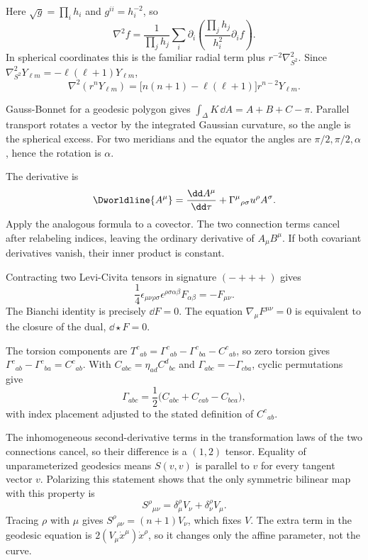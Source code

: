 \begin{solutions}
\begin{solution}
Here \(\sqrt g=\prod_i h_i\) and \(g^{ii}=h_i^{-2}\), so
\[
\nabla^2f=\frac1{\prod_jh_j}
\sum_i\partial_i\left(\frac{\prod_jh_j}{h_i^2}\partial_i f\right).
\]
In spherical coordinates this is the familiar radial term plus
\(r^{-2}\nabla^2_{S^2}\).  Since
\(\nabla^2_{S^2}Y_{\ell m}=-\ell(\ell+1)Y_{\ell m}\),
\[
\nabla^2(r^nY_{\ell m})
=\bigl[n(n+1)-\ell(\ell+1)\bigr]r^{n-2}Y_{\ell m}.
\]
\end{solution}

\begin{solution}
Gauss-Bonnet for a geodesic polygon gives
\(\int_\Delta K\,\dd A=A+B+C-\pi\).  Parallel transport rotates a vector by
the integrated Gaussian curvature, so the angle is the spherical excess.
For two meridians and the equator the angles are
\(\pi/2,\pi/2,\alpha\), hence the rotation is \(\alpha\).
\end{solution}

\begin{solution}
The derivative is
\[
\Dworldline{A^\mu}
=\frac{\dd A^\mu}{\dd\tau}
+\Gamma^\mu{}_{\rho\sigma}u^\rho A^\sigma.
\]
Apply the analogous formula to a covector.  The two connection terms cancel
after relabeling indices, leaving the ordinary derivative of \(A_\mu B^\mu\).
If both covariant derivatives vanish, their inner product is constant.
\end{solution}

\begin{solution}
Contracting two Levi-Civita tensors in signature \((-+++)\) gives
\[
\frac14\epsilon_{\mu\nu\rho\sigma}
\epsilon^{\rho\sigma\alpha\beta}F_{\alpha\beta}
=-F_{\mu\nu}.
\]
The Bianchi identity is precisely \(\dd F=0\).  The equation
\(\nabla_\mu F^{\mu\nu}=0\) is equivalent to the closure of the dual,
\(\dd\star F=0\).
\end{solution}

\begin{solution}
The torsion components are
\(T^c{}_{ab}=\Gamma^c{}_{ab}-\Gamma^c{}_{ba}-C^c{}_{ab}\), so zero torsion
gives
\(\Gamma^c{}_{ab}-\Gamma^c{}_{ba}=C^c{}_{ab}\).
With \(C_{abc}=\eta_{ad}C^d{}_{bc}\) and
\(\Gamma_{abc}=-\Gamma_{cba}\), cyclic permutations give
\[
\Gamma_{abc}
=\frac12\bigl(C_{abc}+C_{cab}-C_{bca}\bigr),
\]
with index placement adjusted to the stated definition of \(C^c{}_{ab}\).
\end{solution}

\begin{solution}
The inhomogeneous second-derivative terms in the transformation laws of the
two connections cancel, so their difference is a \((1,2)\) tensor.  Equality
of unparameterized geodesics means \(S(v,v)\) is parallel to \(v\) for every
tangent vector \(v\).  Polarizing this statement shows that the only
symmetric bilinear map with this property is
\[
S^\rho{}_{\mu\nu}
=\delta^\rho_\mu V_\nu+\delta^\rho_\nu V_\mu.
\]
Tracing \(\rho\) with \(\mu\) gives
\(S^\rho{}_{\rho\nu}=(n+1)V_\nu\), which fixes \(V\).  The extra term in the
geodesic equation is \(2(V_\mu\dot x^\mu)\dot x^\rho\), so it changes only
the affine parameter, not the curve.
\end{solution}


\end{solutions}
